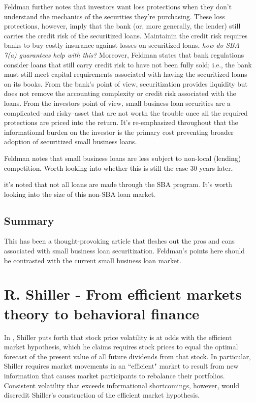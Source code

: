 \documentclass{article}
\begin{document}
Feldman further notes that investors want loss protections when they don't understand the mechanics of the securities they're purchasing.  These loss protections, however, imply that the bank (or, more generally, the lender) still carries the credit risk of the securitized loans.  Maintainin the credit risk requires banks to buy costly insurance against losses on securitized loans.  \note{[Consider]:} {\it how do SBA 7(a) guarantees help with this?}  Moreover, Feldman states that bank regulations consider loans that still carry credit risk to have not been fully sold; i.e., the bank must still meet capital requirements associated with having the securitized loans on its books.  From the bank's point of view, securitization provides liquidity but does not remove the accounting complexity or credit risk associated with the loans.  From the investors point of view, small business loan securities are a complicated--and risky--asset that are not worth the trouble once all the required protections are priced into the return.  It's re-emphasized throughout that the informational burden on the investor is the primary cost preventing broader adoption of securitized small business loans.

\note{[Competition]:} Feldman notes that small business loans are less subject to non-local (lending) competition.  Worth looking into whether this is still the case 30 years later.

 it's noted that not all loans are made through the SBA program.  It's worth looking into the size of this non-SBA loan market.


\subsection{Summary}

This has been a thought-provoking article that fleshes out the pros and cons associated with small business loan securitization.  Feldman's points here should be contrasted with the current small business loan market.


\section{R. Shiller - From efficient markets theory to behavioral finance}

In \cite{Shiller2003}, Shiller puts forth that stock price volatility is at odds with the efficient market hypothesis, which he claims requires stock prices to equal the optimal forecast of the present value of all future dividends from that stock.  In particular, Shiller requires market movements in an ``efficient" market to result from new information that causes market participants to rebalance their portfolios.  Consistent volatility that exceeds informational shortcomings, however, would discredit Shiller's construction of the efficient market hypothesis.
\end{document}
